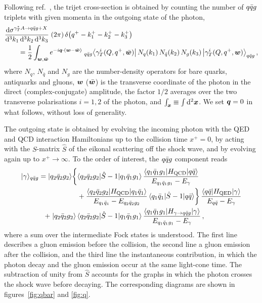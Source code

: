 Following ref.~\cite{Iancu:2022gpw}, the trijet cross-section is obtained by counting the number of
$q\bar q g$ triplets with given momenta in the outgoing state of the photon,
\begin{align}
&\frac{{\rm d}\sigma^{\gamma^{*}_{T} A\to q\bar q g+X}}{{\rm d}^3k_1\,{\rm d}^3k_2\,{\rm d}^3k_3}\;(2\pi)\,\delta\big(q^+-k_1^+-k_2^+-k_3^+\big)
\nonumber\\
&\qquad=\frac12\int_{\bm{w},\bar{\bm{w}}}e^{-i\bm{q}\cdot(\bm{w}-\bar{\bm{w}})}\;
{}_{q\bar q g}\big\langle\gamma_T^i(Q,q^+,\bar{\bm{w}})\big|\,N_q(k_1)\,N_{\bar q}(k_2)\,N_g(k_3)\,
\big|\gamma_T^i(Q,q^+,\bm{w})\big\rangle_{q\bar q g}\,,
\label{eq:xsdef}
\end{align}
where $N_q$, $N_{\bar q}$ and $N_g$ are the number-density operators for bare quarks, antiquarks and
gluons, $\bm{w}$ ($\bar{\bm{w}}$) is the transverse coordinate of the photon in the direct (complex-conjugate)
amplitude, the factor $1/2$ averages over the two transverse polarisations $i=1,2$ of the photon, and
$\int_{\bm{x}}\equiv\int{\rm d}^2\bm{x}$. We set $\bm{q}=0$ in what follows, without loss of generality.

The outgoing state is obtained by evolving the incoming photon with the QED and QCD interaction
Hamiltonians up to the collision time $x^+=0$, by acting with the $S$-matrix $\hat S$ of the eikonal
scattering off the shock wave, and by evolving again up to $x^+\to\infty$. To the order of interest, the
$q\bar q g$ component reads~\cite{Iancu:2022gpw}
\begin{align}
|\gamma\rangle_{q\bar q g}=|q_2\bar q_2g_2\rangle\bigg\{&
\langle q_2\bar q_2g_2|\hat S-1|q_1\bar q_1g_1\rangle\,
\frac{\langle q_1\bar q_1g_1|H_{\rm QCD}|q\bar q\rangle}{E_{q_1\bar q_1g_1}-E_\gamma}
\nonumber\\
&+\frac{\langle q_2\bar q_2g_2|H_{\rm QCD}|q_1\bar q_1\rangle}{E_{q_1\bar q_1}-E_{q_2\bar q_2g_2}}\,
\langle q_1\bar q_1|\hat S-1|q\bar q\rangle\bigg\}\,
\frac{\langle q\bar q|H_{\rm QED}|\gamma\rangle}{E_{q\bar q}-E_\gamma}
\nonumber\\
+\;|q_2\bar q_2g_2\rangle\,&\langle q_2\bar q_2g_2|\hat S-1|q_1\bar q_1g_1\rangle\,
\frac{\langle q_1\bar q_1g_1|H_{\gamma\to q\bar q g}|\gamma\rangle}{E_{q_1\bar q_1g_1}-E_\gamma}\,,
\label{eq:formal}
\end{align}
where a sum over the intermediate Fock states is understood. The first line describes a gluon emission
before the collision, the second line a gluon emission after the collision, and the third line the
instantaneous contribution, in which the photon decay and the gluon emission occur at the same
light-cone time. The subtraction of unity from $\hat S$ accounts for the graphs in which the photon
crosses the shock wave before decaying. The corresponding diagrams are shown in
figures~\ref{fig:qbar} and \ref{fig:q}.

